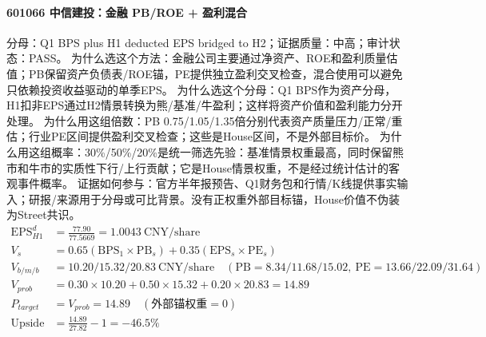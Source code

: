\paragraph{601066 中信建投：金融 PB/ROE + 盈利混合}
分母：Q1 BPS plus H1 deducted EPS bridged to H2；证据质量：中高；审计状态：PASS。
为什么选这个方法：金融公司主要通过净资产、ROE和盈利质量估值；PB保留资产负债表/ROE锚，PE提供独立盈利交叉检查，混合使用可以避免只依赖投资收益驱动的单季EPS。
为什么选这个分母：Q1 BPS作为资产分母，H1扣非EPS通过H2情景转换为熊/基准/牛盈利；这样将资产价值和盈利能力分开处理。
为什么用这组倍数：PB 0.75/1.05/1.35倍分别代表资产质量压力/正常/重估；行业PE区间提供盈利交叉检查；这些是House区间，不是外部目标价。
为什么用这组概率：30\%/50\%/20\%是统一筛选先验：基准情景权重最高，同时保留熊市和牛市的实质性下行/上行贡献；它是House情景权重，不是经过统计估计的客观事件概率。
证据如何参与：官方半年报预告、Q1财务包和行情/K线提供事实输入；研报/来源用于分母或可比背景。没有正权重外部目标锚，House价值不伪装为Street共识。
\begin{align*}
\mathrm{EPS}_{H1}^d &= \frac{77.90}{77.5669} = 1.0043\ \mathrm{CNY/share}\\
V_s &= 0.65\left(\mathrm{BPS}_1\times \mathrm{PB}_s\right)+0.35\left(\mathrm{EPS}_s\times \mathrm{PE}_s\right)\\
V_{b/m/b} &= 10.20/15.32/20.83\ \mathrm{CNY/share}\quad(\mathrm{PB}=8.34/11.68/15.02,\ \mathrm{PE}=13.66/22.09/31.64)\\
V_{prob} &= 0.30\times 10.20+0.50\times 15.32+0.20\times 20.83=14.89\\
P_{target} &= V_{prob}=14.89\quad(\text{外部锚权重}=0)\\
\mathrm{Upside} &= \frac{14.89}{27.82}-1=-46.5\%\\
\end{align*}

